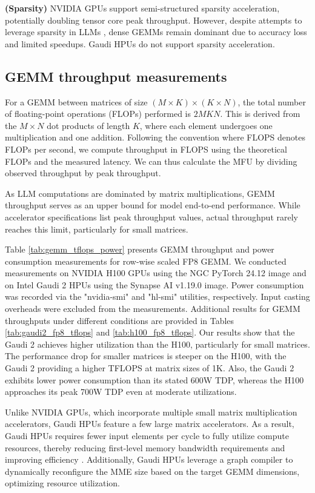 \textbf{(Sparsity)} NVIDIA GPUs support semi-structured sparsity acceleration, potentially doubling tensor core peak throughput. However, despite attempts to leverage sparsity in LLMs \citep{sparsegpt, wanda_sun2024a}, dense GEMMs remain dominant due to accuracy loss and limited speedups. Gaudi HPUs do not support sparsity acceleration.

\subsection{GEMM throughput measurements}




For a GEMM between matrices of size $(M \times K) \times (K \times N)$, the total number of floating-point operations (FLOPs) performed is $2MKN$. This is derived from the $M \times N$ dot products of length $K$, where each element undergoes one multiplication and one addition.
Following the convention where FLOPS denotes FLOPs per second, we compute throughput in FLOPS using the theoretical FLOPs and the measured latency. We can thus calculate the MFU by dividing observed throughput by peak throughput.

As LLM computations are dominated by matrix multiplications, GEMM throughput serves as an upper bound for model end-to-end performance. While accelerator specifications list peak throughput values, actual throughput rarely reaches this limit, particularly for small matrices.

Table \ref{tab:gemm_tflops_power} presents GEMM throughput and power consumption measurements for row-wise scaled FP8 GEMM. We conducted measurements on NVIDIA H100 GPUs using the NGC PyTorch 24.12 image and on Intel Gaudi 2 HPUs using the Synapse AI v1.19.0 image. Power consumption was recorded via the "nvidia-smi" and "hl-smi" utilities, respectively. Input casting overheads were excluded from the measurements. Additional results for GEMM throughputs under different conditions are provided in Tables \ref{tab:gaudi2_fp8_tflops} and \ref{tab:h100_fp8_tflops}.
Our results show that the Gaudi 2 achieves higher utilization than the H100, particularly for small matrices. The performance drop for smaller matrices is steeper on the H100, with the Gaudi 2 providing a higher TFLOPS at matrix sizes of 1K. Also, the Gaudi 2 exhibits lower power consumption than its stated 600W TDP, whereas the H100 approaches its peak 700W TDP even at moderate utilizations.

Unlike NVIDIA GPUs, which incorporate multiple small matrix multiplication accelerators, Gaudi HPUs feature a few large matrix accelerators. As a result, Gaudi HPUs requires fewer input elements per cycle to fully utilize compute resources, thereby reducing first-level memory bandwidth requirements and improving efficiency \citep{gaudi2_whitepaper, gaudi3_whitepaper}. Additionally, Gaudi HPUs leverage a graph compiler to dynamically reconfigure the MME size based on the target GEMM dimensions, optimizing resource utilization.

